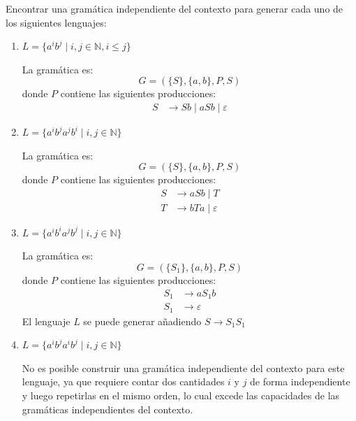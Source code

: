 \documentclass[12pt]{report} %
\begin{document}
\begin{ejercicioresuelto}
Encontrar una gramática independiente del contexto para generar cada uno de los siguientes lenguajes:

\begin{enumerate}
    \item \( L = \{a^i b^j \mid i, j \in \mathbb{N}, i \leq j\} \)

    \begin{solucion}
    La gramática es:
    \[
    G = (\{S\}, \{a, b\}, P, S)
    \]
    donde \( P \) contiene las siguientes producciones:
    \[
    \begin{aligned}
        S &\to Sb \mid aSb \mid \varepsilon
    \end{aligned}
    \]
    \end{solucion}

    \item \( L = \{a^i b^j a^j b^i \mid i, j \in \mathbb{N}\} \)

    \begin{solucion}
    La gramática es:
    \[
    G = (\{S\}, \{a, b\}, P, S)
    \]
    donde \( P \) contiene las siguientes producciones:
    \[
    \begin{aligned}
        S &\to aSb \mid T \\
        T &\to bTa \mid \varepsilon
    \end{aligned}
    \]
    \end{solucion}

    \item \( L = \{a^i b^i a^j b^j \mid i, j \in \mathbb{N}\} \)

    \begin{solucion}
    La gramática es:
    \[
    G = (\{S_1\}, \{a, b\}, P, S)
    \]
    donde \( P \) contiene las siguientes producciones:
    \[
    \begin{aligned}
        S_1 &\to aS_1b \\
        S_1 &\to \varepsilon
    \end{aligned}
    \]
    El lenguaje $L$ se puede generar añadiendo $S \rightarrow S_1S_1$
    \end{solucion}

    \item \( L = \{a^i b^j a^i b^j \mid i, j \in \mathbb{N}\} \)

    \begin{solucion}
    No es posible construir una gramática independiente del contexto para este lenguaje, ya que requiere contar dos cantidades \( i \) y \( j \) de forma independiente y luego repetirlas en el mismo orden, lo cual excede las capacidades de las gramáticas independientes del contexto.
    \end{solucion}


\end{enumerate}
\end{ejercicioresuelto}
\end{document}
